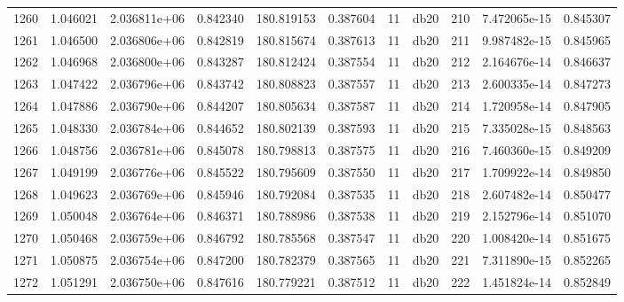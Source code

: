 \begin{tabular}{lrrrrrrlrrr}
1260 &    1.046021 &        2.036811e+06 &  0.842340 &              180.819153 &    0.387604 &      11 &         db20 &    210 &   7.472065e-15 &      0.845307 \\
1261 &    1.046500 &        2.036806e+06 &  0.842819 &              180.815674 &    0.387613 &      11 &         db20 &    211 &   9.987482e-15 &      0.845965 \\
1262 &    1.046968 &        2.036800e+06 &  0.843287 &              180.812424 &    0.387554 &      11 &         db20 &    212 &   2.164676e-14 &      0.846637 \\
1263 &    1.047422 &        2.036796e+06 &  0.843742 &              180.808823 &    0.387557 &      11 &         db20 &    213 &   2.600335e-14 &      0.847273 \\
1264 &    1.047886 &        2.036790e+06 &  0.844207 &              180.805634 &    0.387587 &      11 &         db20 &    214 &   1.720958e-14 &      0.847905 \\
1265 &    1.048330 &        2.036784e+06 &  0.844652 &              180.802139 &    0.387593 &      11 &         db20 &    215 &   7.335028e-15 &      0.848563 \\
1266 &    1.048756 &        2.036781e+06 &  0.845078 &              180.798813 &    0.387575 &      11 &         db20 &    216 &   7.460360e-15 &      0.849209 \\
1267 &    1.049199 &        2.036776e+06 &  0.845522 &              180.795609 &    0.387550 &      11 &         db20 &    217 &   1.709922e-14 &      0.849850 \\
1268 &    1.049623 &        2.036769e+06 &  0.845946 &              180.792084 &    0.387535 &      11 &         db20 &    218 &   2.607482e-14 &      0.850477 \\
1269 &    1.050048 &        2.036764e+06 &  0.846371 &              180.788986 &    0.387538 &      11 &         db20 &    219 &   2.152796e-14 &      0.851070 \\
1270 &    1.050468 &        2.036759e+06 &  0.846792 &              180.785568 &    0.387547 &      11 &         db20 &    220 &   1.008420e-14 &      0.851675 \\
1271 &    1.050875 &        2.036754e+06 &  0.847200 &              180.782379 &    0.387565 &      11 &         db20 &    221 &   7.311890e-15 &      0.852265 \\
1272 &    1.051291 &        2.036750e+06 &  0.847616 &              180.779221 &    0.387512 &      11 &         db20 &    222 &   1.451824e-14 &      0.852849 \\

\end{tabular}
